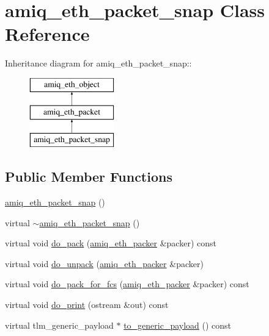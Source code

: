 \hypertarget{classamiq__eth__packet__snap}{
\section{amiq\_\-eth\_\-packet\_\-snap Class Reference}
\label{classamiq__eth__packet__snap}
}
Inheritance diagram for amiq\_\-eth\_\-packet\_\-snap::\begin{figure}[H]
\begin{center}
\leavevmode
\includegraphics[height=3cm]{classamiq__eth__packet__snap}
\end{center}
\end{figure}
\subsection*{Public Member Functions}
\begin{DoxyCompactItemize}
\item 
\hyperlink{classamiq__eth__packet__snap_a768dde5515c9a9d5ca0cb56b1d01d14b}{amiq\_\-eth\_\-packet\_\-snap} ()
\item 
virtual \hyperlink{classamiq__eth__packet__snap_a4e5486a36616f6fda29c1248796704fb}{$\sim$amiq\_\-eth\_\-packet\_\-snap} ()
\item 
virtual void \hyperlink{classamiq__eth__packet__snap_ace29c0c126f983a5e88ff933f1b34ff6}{do\_\-pack} (\hyperlink{classamiq__eth__packer}{amiq\_\-eth\_\-packer} \&packer) const 
\item 
virtual void \hyperlink{classamiq__eth__packet__snap_a7bb9ce14ff76d5bacb715a53382a7816}{do\_\-unpack} (\hyperlink{classamiq__eth__packer}{amiq\_\-eth\_\-packer} \&packer)
\item 
virtual void \hyperlink{classamiq__eth__packet__snap_a042b049988a9e938cb80acb497cfafe5}{do\_\-pack\_\-for\_\-fcs} (\hyperlink{classamiq__eth__packer}{amiq\_\-eth\_\-packer} \&packer) const 
\item 
virtual void \hyperlink{classamiq__eth__packet__snap_af0ca9e38d460f39767d5abf60f48cee9}{do\_\-print} (ostream \&out) const 
\item 
virtual tlm\_\-generic\_\-payload $\ast$ \hyperlink{classamiq__eth__packet__snap_a99256008f171d933ec625d7957b64270}{to\_\-generic\_\-payload} () const 
\end{DoxyCompactItemize}
